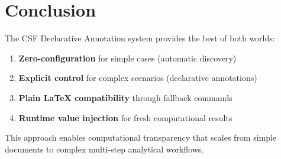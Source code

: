 \documentclass{article}
\begin{document}
\section{Conclusion}

The CSF Declarative Annotation system provides the best of both worlds:
\begin{enumerate}
    \item \textbf{Zero-configuration} for simple cases (automatic discovery)
    \item \textbf{Explicit control} for complex scenarios (declarative annotations)
    \item \textbf{Plain LaTeX compatibility} through fallback commands
    \item \textbf{Runtime value injection} for fresh computational results
\end{enumerate}

This approach enables computational transparency that scales from simple documents 
to complex multi-step analytical workflows.
\end{document}
